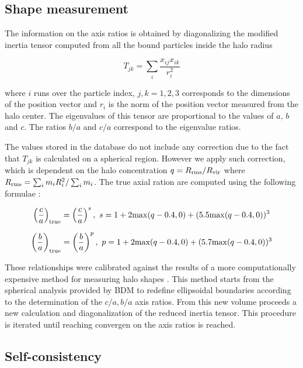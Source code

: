 \subsection{Shape measurement}
The information on the axis ratios is obtained by diagonalizing the
modified inertia tensor computed from all the bound particles inside
the halo radius

\begin{equation}
T_{jk}  = \sum_{i}\frac{x_{ij}x_{ik}}{r_i^2}
\end{equation}

where $i$ runs over the particle index, $j,k=1,2,3$ corresponds to
the dimensions of the position vector and $r_i$ is the norm of the
position vector measured from the halo center. The eigenvalues of this
tensor are proportional to the values of $a$, $b$ and $c$. The ratios
$b/a$ and $c/a$ correspond to the eigenvalue ratios.

The values stored in the database do not include any correction due to
the fact that $T_{jk}$ is calculated on a spherical region. However we
apply such correction, which is dependent on the halo concentration
$q=R_{\rm rms}/R_{\rm vir}$ where $R_{\rm rms}=\sum_i m_iR_i^2/\sum_i
  m_i$. The true axial ration are computed using the following
  formulae \citep{Riebe:2011gp}:

\begin{equation}
\left(\frac{c}{a}\right)_{\rm true}  =
\left(\frac{c}{a}\right)^s,\ s=1 + 2{\rm max}(q - 0.4,0) +(5.5{\rm max}(q-0.4,0))^3
\label{eq:shape1}
\end{equation} 

\begin{equation}
\left(\frac{b}{a}\right)_{\rm true}  =
\left(\frac{b}{a}\right)^p,\ p=1 + 2{\rm max}(q - 0.4,0) +(5.7{\rm
  max}(q-0.4,0))^3
\label{eq:shape2}
\end{equation} 

These relationships were calibrated against the results of a more
computationally expensive method for  measuring halo shapes
\citep{Allgood:2005eu}. This method starts from the spherical analysis
provided by BDM to redefine ellipsoidal boundaries according to the
determination of the $c/a,b/a$ axis ratios. From this new volume
proceeds a new calculation and diagonalization of the reduced inertia
tensor. This procedure is iterated until reaching convergen on the
axis ratios is reached. 


\subsection{Self-consistency}

